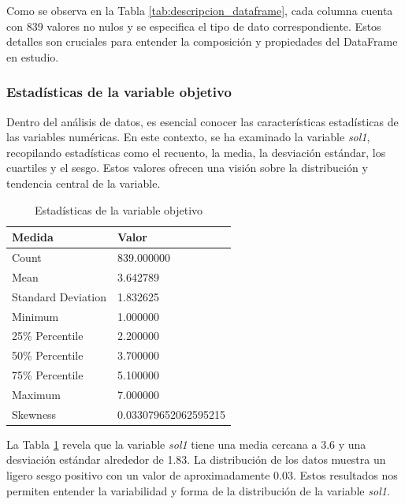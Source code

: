 Como se observa en la Tabla \ref{tab:descripcion_dataframe}, cada columna cuenta con 839 valores no nulos y se especifica el tipo de dato correspondiente. Estos detalles son cruciales para entender la composición y propiedades del DataFrame en estudio.

\subsubsection{Estadísticas de la variable objetivo}

Dentro del análisis de datos, es esencial conocer las características estadísticas de las variables numéricas. En este contexto, se ha examinado la variable \textit{sol1}, recopilando estadísticas como el recuento, la media, la desviación estándar, los cuartiles y el sesgo. Estos valores ofrecen una visión sobre la distribución y tendencia central de la variable.

\begin{table}[H]
    \centering
    \caption{Estadísticas de la variable objetivo}
    \begin{tabular}{ll}
        \hline
        \textbf{Medida}    & \textbf{Valor}       \\
        \hline
        Count              & 839.000000           \\
        Mean               & 3.642789             \\
        Standard Deviation & 1.832625             \\
        Minimum            & 1.000000             \\
        25\% Percentile    & 2.200000             \\
        50\% Percentile    & 3.700000             \\
        75\% Percentile    & 5.100000             \\
        Maximum            & 7.000000             \\
        Skewness           & 0.033079652062595215 \\
        \hline
    \end{tabular}%
    \label{tab:estadistica_variable_sol1}%
\end{table}%

La Tabla \ref{tab:estadistica_variable_sol1} revela que la variable \textit{sol1} tiene una media cercana a 3.6 y una desviación estándar alrededor de 1.83. La distribución de los datos muestra un ligero sesgo positivo con un valor de aproximadamente 0.03. Estos resultados nos permiten entender la variabilidad y forma de la distribución de la variable \textit{sol1}.

